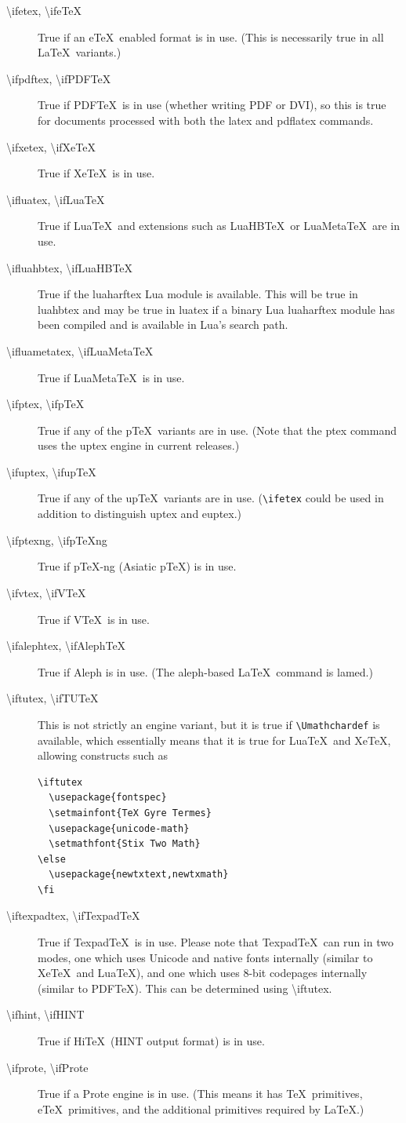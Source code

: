 \documentclass{article}
\newcommand\cs[1]{{\ttfamily\textbackslash #1}}
\begin{document}
\begin{description}
\item[\cs{ifetex},      \cs{ifeTeX}]
True if an e\TeX\ enabled format is in use. (This is necessarily true
in all \LaTeX\ variants.)
\item[\cs{ifpdftex},    \cs{ifPDFTeX}]
True if PDF\TeX\ is in use (whether writing PDF or DVI), so this is
true for documents processed with both the  \textsf{latex} and
\textsf{pdflatex} commands.
\item[\cs{ifxetex},     \cs{ifXeTeX}]
True if Xe\TeX\ is in use.
\item[\cs{ifluatex},    \cs{ifLuaTeX}]
True if Lua\TeX\ and extensions such as LuaHB\TeX\ or LuaMeta\TeX\ are in use.
\item[\cs{ifluahbtex},  \cs{ifLuaHBTeX}]
True if the \textsf{luaharftex} Lua module is available.
This will be true in \textsf{luahbtex} and may be true in
\textsf{luatex} if a binary Lua \textsf{luaharftex} module has been
compiled and is available in Lua's search path.
\item[\cs{ifluametatex},  \cs{ifLuaMetaTeX}]
True if LuaMeta\TeX\ is in use.
\item[\cs{ifptex},      \cs{ifpTeX}]
True if any of the p\TeX\ variants are in use. (Note that the \textsf{ptex} command
uses the \textsf{uptex} engine in current releases.)
\item[\cs{ifuptex},     \cs{ifupTeX}]
True if any of the up\TeX\ variants are in use. (\verb|\ifetex| could
be used in addition to distinguish \textsf{uptex} and \textsf{euptex}.)
\item[\cs{ifptexng},    \cs{ifpTeXng}]
True if p\TeX-ng (Asiatic p\TeX) is in use.
\item[\cs{ifvtex},      \cs{ifVTeX}]
True if V\TeX\ is in use.
\item[\cs{ifalephtex},  \cs{ifAlephTeX}]
True if Aleph is in use. (The \textsf{aleph}-based \LaTeX\ command is
\textsf{lamed}.)
\item[\cs{iftutex},     \cs{ifTUTeX}]
This is not strictly an engine variant, but it is true if
\verb|\Umathchardef| is available, which essentially means that it is
true for Lua\TeX\ and Xe\TeX, allowing constructs such as
\begin{verbatim}
\iftutex
  \usepackage{fontspec}
  \setmainfont{TeX Gyre Termes}
  \usepackage{unicode-math}
  \setmathfont{Stix Two Math}
\else
  \usepackage{newtxtext,newtxmath}
\fi
\end{verbatim}
\item[\cs{iftexpadtex}, \cs{ifTexpadTeX}]
True if Texpad\TeX\ is in use. Please note that Texpad\TeX\ can run in two
modes, one which uses Unicode and native fonts internally (similar to
Xe\TeX\ and Lua\TeX), and one which uses 8-bit codepages internally (similar to
PDF\TeX). This can be determined using \cs{iftutex}.
\item[\cs{ifhint}, \cs{ifHINT}]
True if Hi\TeX\ (HINT output format) is in use.
\item[\cs{ifprote}, \cs{ifProte}]
True if a Prote engine is in use. (This means it has \TeX\
primitives, e\TeX\ primitives, and the additional primitives required
by \LaTeX.)
\end{description}
\end{document}
